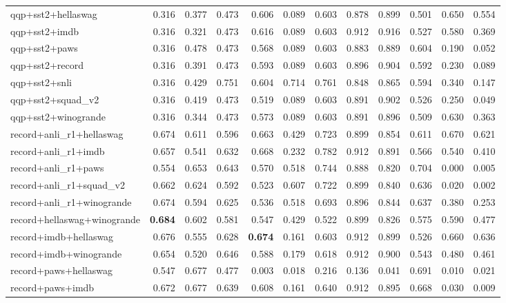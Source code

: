 \begin{table}[t]
\begin{tabular}{lrrrrrrrrrrr}
    qqp+sst2+hellaswag & 0.316 & 0.377 & 0.473 & 0.606 & 0.089 & 0.603 & 0.878 & 0.899 & 0.501 & 0.650 & 0.554 \\
    qqp+sst2+imdb & 0.316 & 0.321 & 0.473 & 0.616 & 0.089 & 0.603 & 0.912 & 0.916 & 0.527 & 0.580 & 0.369 \\
    qqp+sst2+paws & 0.316 & 0.478 & 0.473 & 0.568 & 0.089 & 0.603 & 0.883 & 0.889 & 0.604 & 0.190 & 0.052 \\
    qqp+sst2+record & 0.316 & 0.391 & 0.473 & 0.593 & 0.089 & 0.603 & 0.896 & 0.904 & 0.592 & 0.230 & 0.089 \\
    qqp+sst2+snli & 0.316 & 0.429 & 0.751 & 0.604 & 0.714 & 0.761 & 0.848 & 0.865 & 0.594 & 0.340 & 0.147 \\
    qqp+sst2+squad\_v2 & 0.316 & 0.419 & 0.473 & 0.519 & 0.089 & 0.603 & 0.891 & 0.902 & 0.526 & 0.250 & 0.049 \\
    qqp+sst2+winogrande & 0.316 & 0.344 & 0.473 & 0.573 & 0.089 & 0.603 & 0.891 & 0.896 & 0.509 & 0.630 & 0.363 \\
    record+anli\_r1+hellaswag & 0.674 & 0.611 & 0.596 & 0.663 & 0.429 & 0.723 & 0.899 & 0.854 & 0.611 & 0.670 & 0.621 \\
    record+anli\_r1+imdb & 0.657 & 0.541 & 0.632 & 0.668 & 0.232 & 0.782 & 0.912 & 0.891 & 0.566 & 0.540 & 0.410 \\
    record+anli\_r1+paws & 0.554 & 0.653 & 0.643 & 0.570 & 0.518 & 0.744 & 0.888 & 0.820 & 0.704 & 0.000 & 0.005 \\
    record+anli\_r1+squad\_v2 & 0.662 & 0.624 & 0.592 & 0.523 & 0.607 & 0.722 & 0.899 & 0.840 & 0.636 & 0.020 & 0.002 \\
    record+anli\_r1+winogrande & 0.674 & 0.594 & 0.625 & 0.536 & 0.518 & 0.693 & 0.896 & 0.844 & 0.637 & 0.380 & 0.253 \\
    record+hellaswag+winogrande & \textbf{0.684} & 0.602 & 0.581 & 0.547 & 0.429 & 0.522 & 0.899 & 0.826 & 0.575 & 0.590 & 0.477 \\
    record+imdb+hellaswag & 0.676 & 0.555 & 0.628 & \textbf{0.674} & 0.161 & 0.603 & 0.912 & 0.899 & 0.526 & 0.660 & 0.636 \\
    record+imdb+winogrande & 0.654 & 0.520 & 0.646 & 0.588 & 0.179 & 0.618 & 0.912 & 0.900 & 0.543 & 0.480 & 0.461 \\
    record+paws+hellaswag & 0.547 & 0.677 & 0.477 & 0.003 & 0.018 & 0.216 & 0.136 & 0.041 & 0.691 & 0.010 & 0.021 \\
    record+paws+imdb & 0.672 & 0.677 & 0.639 & 0.608 & 0.161 & 0.640 & 0.912 & 0.895 & 0.668 & 0.030 & 0.009 \\

\end{tabular}
\end{table}
